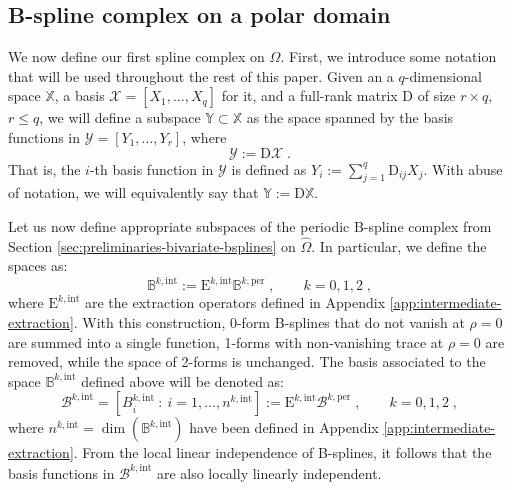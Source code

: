 \documentclass[10pt]{article}
\newcommand{\mbf}[1]{{\boldsymbol{#1}}}
\newcommand{\basis}[1]{\mathcal{#1}}
\newcommand{\vSpace}[1]{\mathbb{#1}}
\newcommand{\mat}[1]{\mbf{\mathrm{#1}}}
\newcommand{\tpDomain}{\widehat{\Omega}}
\newcommand{\cU}{\theta}
\newcommand{\cV}{\rho}
\newcommand{\kntU}{\cU}
\newcommand{\kntV}{\cV}
\newcommand{\kntsU}{\mbf{\kntU}}
\newcommand{\kntsV}{\mbf{\kntV}}
\newcommand{\pkntsU}{\kntsU^\per}
\newcommand{\bsp}{B}
\newcommand{\bspB}{\basis{\bsp}}
\newcommand{\bspS}{\vSpace{\bsp}}
\newcommand{\tpF}[2]{\bspS^{#1}}
\newcommand{\tpB}[2]{\bspB^{#1}}
\newcommand{\per}{\mathrm{per}}
\newcommand{\tint}{\mathrm{int}}
\newcommand{\polarDomain}{\Omega}
\theoremstyle{plain}
\theoremstyle{definition}
\theoremstyle{remark}
\begin{document}
\subsection{B-spline complex on a polar domain}
We now define our first spline complex on $\polarDomain$.
First, we introduce some notation that will be used throughout the rest of this paper.
Given an a $q$-dimensional space $\vSpace{X}$, a basis $\basis{X} = [X_1, \dots, X_q]$ for it, and a full-rank matrix $\mat{D}$ of size $r \times q$, $r \leq q$, we will define a subspace $\vSpace{Y} \subset \vSpace{X}$ as the space spanned by the basis functions in $\basis{Y} = [Y_1, \dots, Y_r]$, where
\begin{equation}
    \basis{Y} := \mat{D}\basis{X}\;.
\end{equation}
That is, the $i$-th basis function in $\basis{Y}$ is defined as $Y_i := \sum_{j=1}^{q} \mat{D}_{ij}X_j$.
With abuse of notation, we will equivalently say that $\vSpace{Y} := \mat{D}\vSpace{X}$.

Let us now define appropriate subspaces of the periodic B-spline complex from Section \ref{sec:preliminaries-bivariate-bsplines} on $\tpDomain$.
In particular, we define the spaces as:
\begin{equation}
    \bspS^{k,\tint} := \mat{E}^{k,\tint}\tpF{k,\per}{\pkntsU,\kntsV}\;,\qquad k = 0, 1, 2\;,
\end{equation}
where $\mat{E}^{k,\tint}$ are the extraction operators defined in Appendix \ref{app:intermediate-extraction}.
With this construction, 0-form B-splines that do not vanish at $\cV=0$ are summed into a single function, 1-forms with non-vanishing trace at $\cV=0$ are removed, while the space of 2-forms is unchanged.
The basis associated to the space $\bspS^{k,\tint}$ defined above will be denoted as:
\begin{equation}
    \bspB^{k,\tint} = \left[ \bsp^{k,\tint}_i~:~i = 1, \dots, n^{k,\tint} \right] := \mat{E}^{k,\tint}\tpB{k,\per}{\kntsU,\kntsV}\;,\qquad k = 0, 1, 2\;,
\end{equation}
where $n^{k,\tint} = \dim(\bspS^{k,\tint})$ have been defined in Appendix \ref{app:intermediate-extraction}.
From the local linear independence of B-splines, it follows that the basis functions in $\bspB^{k,\tint}$ are also locally linearly independent.
\end{document}
